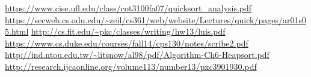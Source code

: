\begin{thebibliography}{99}
 \url{https://www.cise.ufl.edu/class/cot3100fa07/quicksort_analysis.pdf}
\url{https://secweb.cs.odu.edu/~zeil/cs361/web/website/Lectures/quick/pages/ar01s05.html}
\url{http://cs.fit.edu/~pkc/classes/writing/hw13/luis.pdf}
\url{https://www.cs.duke.edu/courses/fall14/cps130/notes/scribe2.pdf}
\url{http://ind.ntou.edu.tw/~litsnow/al98/pdf/Algorithm-Ch6-Heapsort.pdf}
\url{http://research.ijcaonline.org/volume113/number13/pxc3901930.pdf}
\end{thebibliography}

